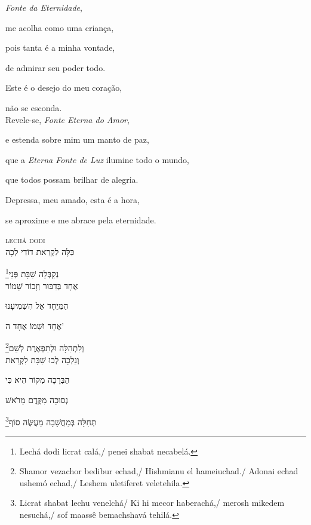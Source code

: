 \movetooddpage
\raggedright

\vspace*{1cm}

\emph{Fonte da Eternidade},

me acolha como uma criança,

pois tanta é a minha vontade,

de admirar seu poder todo.

Este é o desejo do meu coração,

não se esconda.\\[10pt]

Revele-se, \emph{Fonte Eterna do Amor},

e estenda sobre mim um manto de paz,

que a \emph{Eterna Fonte de Luz} ilumine todo o mundo,

que todos possam brilhar de alegria.

Depressa, meu amado, esta é a hora,

se aproxime e me abrace pela eternidade.

\movetoevenpage
\raggedleft
{}\label{lecha}

\vspace*{1cm}

\textsc{lechá dodi}\\[15pt]

כַּלָּה לִקְרַאת דוֹדִי לְכָה

נְקַבְּלָה שַׁבָּת פְּנֵי\footnote{Lechá dodi licrat calá,/ penei shabat necabelá.}\\[10pt]

אֶחָד בְּדִבּוּר וְזָכוֹר שָׁמוֹר

הַמְּיֻחָד אֵל הִשְׁמִיעָנוּ

אֶחָד וּשְׁמוֹ אֶחָד ה' 

וְלִתְהִלָּה וּלְתִפְאֶרֶת לְשֵׁם\footnote{Shamor vezachor bedibur echad,/ Hishmianu el hameiuchad./ Adonai echad ushemó echad,/ Leshem uletiferet veletehila.}\\[10pt]

וְנֵלְכָה לְכוּ שַׁבָּת לִקְרַאת

הַבְּרָכָה מְקוֹר הִיא כִּי

נְסוּכָה מִקֶּדֶם מֵרֹאשׁ 

תְּחִלָּה בְּמַחֲשָׁבָה מַעֲשֶּׂה סוֹף\footnote{Licrat shabat lechu venelchá/ Ki hi mecor haberachá,/ merosh mikedem nesuchá,/ sof maassê bemachshavá tehilá.}\\[10pt]

